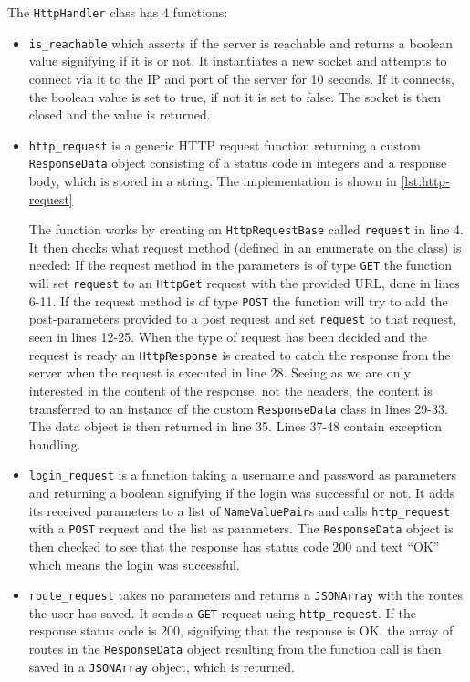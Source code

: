 The \texttt{HttpHandler} class has 4 functions: 
\begin{itemize}
	\item{\texttt{is\_reachable} which asserts if the server is reachable and returns a boolean value signifying if it is or not. It instantiates a new socket and attempts to connect via it to the IP and port of the server for 10 seconds. If it connects, the boolean value is set to true, if not it is set to false. The socket is then closed and the value is returned.}
	\item{\texttt{http\_request} is a generic \ac{HTTP} request function returning a custom \texttt{ResponseData} object consisting of a status code in integers and a response body, which is stored in a string. The implementation is shown in \autoref{lst:http-request}

	The function works by creating an \texttt{HttpRequestBase} called \texttt{request} in line 4. It then checks what request method (defined in an enumerate on the class) is needed: If the request method in the parameters is of type \texttt{GET} the function will set \texttt{request} to an \texttt{HttpGet} request with the provided URL, done in lines 6-11. If the request method is of type \texttt{POST} the function will try to add the post-parameters provided to a post request and set \texttt{request} to that request, seen in lines 12-25. When the type of request has been decided and the request is ready an \texttt{HttpResponse} is created to catch the response from the server when the request is executed in line 28. Seeing as we are only interested in the content of the response, not the headers, the content is transferred to an instance of the custom \texttt{ResponseData} class in lines 29-33. The data object is then returned in line 35. Lines 37-48 contain exception handling.}
	\item{\texttt{login\_request} is a function taking a username and password as parameters and returning a boolean signifying if the login was successful or not. It adds its received parameters to a list of \texttt{NameValuePair}s and calls \texttt{http\_request} with a \texttt{POST} request and the list as parameters. The \texttt{ResponseData} object is then checked to see that the response has status code 200 and text ``OK'' which means the login was successful.}
	\item{\texttt{route\_request} takes no parameters and returns a \texttt{JSONArray} with the routes the user has saved. It sends a \texttt{GET} request using \texttt{http\_request}. If the response status code is 200, signifying that the response is OK, the array of routes in the \texttt{ResponseData} object resulting from the function call is then saved in a \texttt{JSONArray} object, which is returned.}
\end{itemize}

